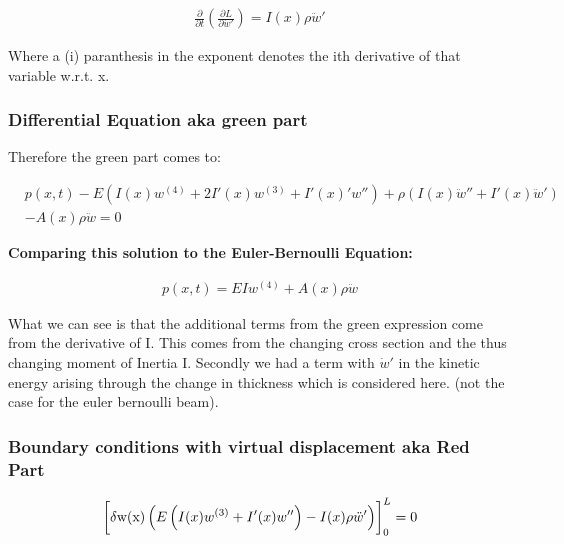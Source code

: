 \begin{equation}
    \begin{split}
        \frac{\partial}{\partial t}(\frac{\partial L}{\partial \dot w'})= I(x)\rho \ddot w'
    \end{split}
\end{equation}

Where a (i) paranthesis in the exponent denotes the ith derivative of that variable w.r.t. x.

\subsubsection{Differential Equation aka green part}

Therefore the green part comes to:

\begin{equation}
    \begin{split}
        &p(x,t)-E\left(I(x)w^{(4)}+2I'(x)w^{(3)}+I'(x)'w''\right)+\rho \left(I(x)\ddot w''+I'(x)\ddot w'\right)\\
        &-A(x)\rho \ddot w = 0
    \end{split}
\end{equation}

\textbf{Comparing this solution to the Euler-Bernoulli Equation:}

\begin{equation}
    \begin{split}
        p(x,t) = EIw^{(4)} + A(x)\rho \ddot w
    \end{split}
\end{equation}

What we can see is that the additional terms from the green expression come from the derivative of I. This comes from the changing cross section and the thus changing moment of Inertia I. Secondly we had a term with $\dot w'$ in the kinetic energy arising through the change in thickness which is considered here. (not the case for the euler bernoulli beam).

\subsubsection{Boundary conditions with virtual displacement aka Red Part}

\begin{equation}
    \begin{split}
        \left[\vphantom{\int}\mathrm{\delta w(x)}\left(E\left(I(x)w^{(3)}+I'(x)w''\right)-I(x)\rho \ddot w'\right)\right]_0^L  = 0
    \end{split}
\end{equation}

